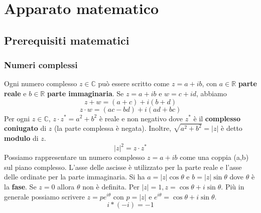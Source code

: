 \documentclass[12pt, a4paper]{report}
\begin{document}
\chapter{Apparato matematico}
\section{Prerequisiti matematici}
\subsection{Numeri complessi}
Ogni numero complesso $z\in \mathbb{C}$ può essere scritto come $z=a+ib$, con $a\in \mathbb{R}$ \textbf{parte reale} e $b\in \mathbb{R}$ \textbf{parte immaginaria}. Se $z=a+ib$ e $w=c+id$, abbiamo
\begin{equation*}
    z+w = (a+c) + i(b+d)
\end{equation*}
\begin{equation*}
    z\cdot w = (ac-bd) + i(ad+bc)
\end{equation*}
Per ogni $z\in \mathbb{C}$, $z\cdot z^{*}=a^{2}+b^{2}$ è reale e non negativo dove $z^{*}$ è il \textbf{complesso coniugato} di $z$ (la parte complessa è negata). Inoltre, $\sqrt{a^{2}+b^{2}}=\lvert z\rvert$ è detto \textbf{modulo} di $z$.
\begin{equation*}
    \lvert z\rvert^{2} = z\cdot z^{*}
\end{equation*}
Possiamo rappresentare un numero complesso $z=a+ib$ come una coppia (a,b) sul piano complesso. L'asse delle ascisse è utilizzato per la parte reale e l'asse delle ordinate per la parte immaginaria. Si ha $a = \lvert z \rvert \cos \theta$ e $b = \lvert z \rvert \sin \theta$ dove $\theta$ è la \textbf{fase}. Se $z=0$ allora $\theta$ non è definita. Per $\lvert z \rvert = 1, z=\cos\theta + i\sin\theta$. Più in generale possiamo scrivere $z=pe^{i\theta}$ con $p=\lvert z \rvert$ e $e^{i\theta}=\cos\theta + i\sin\theta$.
\begin{equation*}
    i*(-i) = -1
\end{equation*}
\end{document}
